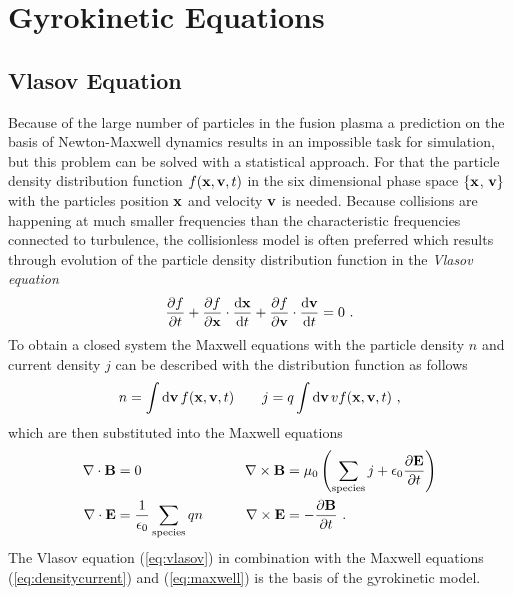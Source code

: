 \newpage
\section{Gyrokinetic Equations}
\label{sec:gyrokinetic}

\subsection{Vlasov Equation}
\label{sub:vlasov}

Because of the large number of particles in the fusion plasma a prediction on the basis of Newton-Maxwell dynamics results in an impossible task for simulation, but this problem can be solved with a statistical approach. For that the particle density distribution function $f(\boldsymbol{\mathbf{x}}, \boldsymbol{\mathbf{v}}, t)$ in the six dimensional phase space $\{\boldsymbol{\mathbf{x}}$, $\boldsymbol{\mathbf{v}}\}$ with the particles position $\boldsymbol{\mathbf{x}}$ and velocity $\boldsymbol{\mathbf{v}}$ is needed. Because collisions are happening at much smaller frequencies than the characteristic frequencies connected to turbulence, the collisionless model is often preferred \cite{Garbet2010} which results through evolution of the particle density distribution function in the \textit{Vlasov equation}
\begin{gather}
	\frac{\partial f}{\partial t} + \frac{\partial f}{\partial \boldsymbol{\mathbf{x}}} \cdot \frac{\mathrm{d}\boldsymbol{\mathbf{x}}}{\mathrm{d}t} + \frac{\partial f}{\partial \boldsymbol{\mathbf{v}}} \cdot \frac{\mathrm{d}\boldsymbol{\mathbf{v}}}{\mathrm{d}t} = 0~.
	\label{eq:vlasov}
\end{gather}
To obtain a closed system the Maxwell equations with the particle density $n$ and current density $j$ can be described with the distribution function as follows
\begin{gather}
	n = \int \mathrm{d}\boldsymbol{\mathbf{v}}\,f(\boldsymbol{\mathbf{x}}, \boldsymbol{\mathbf{v}}, t) \qquad j = q \int \mathrm{d}\boldsymbol{\mathbf{v}}\, v f(\boldsymbol{\mathbf{x}}, \boldsymbol{\mathbf{v}}, t)~,
	\label{eq:densitycurrent}
\end{gather}
which are then substituted into the Maxwell equations
\begin{gather}
	\begin{aligned}
		\nabla \cdot \boldsymbol{\mathbf{B}} &= 0 &\qquad \nabla \times \boldsymbol{\mathbf{B}} &= \mu_0\left( \sum_\mathrm{species} j + \epsilon_0 \frac{\partial \boldsymbol{\mathbf{E}}}{\partial t} \right) \\
		\nabla \cdot \boldsymbol{\mathbf{E}} &= \frac{1}{\epsilon_0} \sum_\mathrm{species} qn &\qquad \nabla \times \boldsymbol{\mathbf{E}} &= - \frac{\partial \boldsymbol{\mathbf{B}}}{\partial t}~.
	\end{aligned}
	\label{eq:maxwell}
\end{gather}
The Vlasov equation (\ref{eq:vlasov}) in combination with the Maxwell equations (\ref{eq:densitycurrent}) and (\ref{eq:maxwell}) is the basis of the gyrokinetic model. \cite{Krommes2012}

